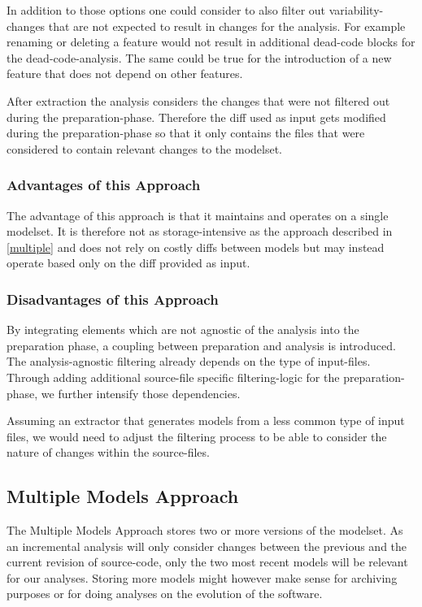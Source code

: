 \documentclass[a4paper]{article}
\begin{document}
In addition to those options one could consider to also filter out variability-changes that are not expected to result in changes for the analysis. For example renaming or deleting a feature would not result in additional dead-code blocks for the dead-code-analysis. The same could be true for the introduction of a new feature that does not depend on other features.

After extraction the analysis considers the changes that were not filtered out during the preparation-phase. Therefore the diff used as input gets modified during the preparation-phase so that it only contains the files that were considered to contain relevant changes to the modelset.

\subsubsection{Advantages of this Approach}

The advantage of this approach is that it maintains and operates on a single modelset. It is therefore not as  storage-intensive as the approach described in \autoref{multiple} and does not rely on costly diffs between models but may instead operate based only on the diff provided as input.

\subsubsection{Disadvantages of this Approach}

By integrating elements which are not agnostic of the analysis into the preparation phase, a coupling between preparation and analysis is introduced. The analysis-agnostic filtering already depends on the type of input-files. Through adding additional source-file specific filtering-logic for the preparation-phase, we further intensify those dependencies.

Assuming an extractor that generates models from a less common type of input files, we would need to adjust the filtering process to be able to consider the nature of changes within the source-files.

\subsection{Multiple Models Approach} \label{multiple}

The Multiple Models Approach stores two or more versions of the modelset. As an incremental analysis will only consider changes between the previous and the current revision of source-code, only the two most recent models will be relevant for our analyses. Storing more models might however make sense for archiving purposes or for doing analyses on the evolution of the software.
\end{document}
